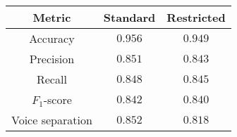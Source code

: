 \begin{tabular}{ccc}
    \textbf{Metric}  & \textbf{Standard} & \textbf{Restricted} \\\hline
    Accuracy         & $0.956$           & $0.949$                \\
    Precision        & $0.851$           & $0.843$                \\
    Recall           & $0.848$           & $0.845$                \\
    $F_1$-score      & $0.842$           & $0.840$                \\
    Voice separation & $0.852$           & $0.818$                \\
\end{tabular}
